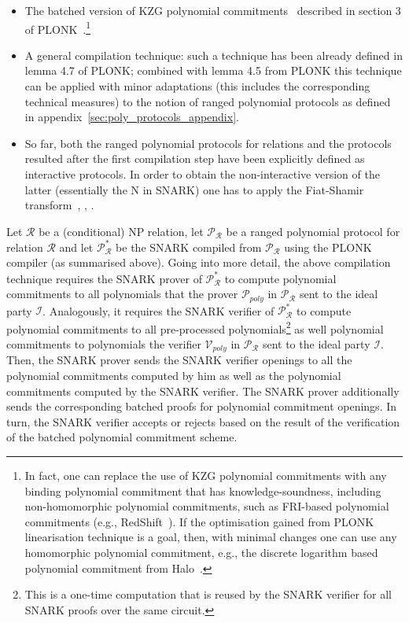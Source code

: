 \begin{itemize}
\item  The batched version of KZG polynomial commitments~\cite{KZG_10} described in section 3 of PLONK~\cite{plonk}.\footnote{In fact, 
one can replace the use of KZG polynomial commitments with any binding polynomial commitment that has knowledge-soundness, including non-homomorphic polynomial commitments, 
such as FRI-based polynomial commitments (e.g., RedShift~\cite{redshift}). If the optimisation gained from PLONK linearisation technique is a goal, 
then, with minimal changes one can use any homomorphic polynomial commitment, e.g., the discrete logarithm based polynomial commitment 
from Halo~\cite{halo}.}
\item A general compilation technique: such a technique has been already defined in lemma 4.7 of PLONK; combined with lemma 4.5 
from PLONK this technique can be applied with minor adaptations (this includes the corresponding technical measures) to the notion of ranged 
polynomial protocols as defined in appendix~\ref{sec:poly_protocols_appendix}.  
\item So far, both the ranged polynomial protocols for relations and the protocols resulted after the first compilation step have been explicitly defined as interactive 
protocols. In order to obtain the non-interactive version of the latter (essentially the N in SNARK) one has to apply the Fiat-Shamir 
transform~\cite{FS_transform}, \cite{FS_transform_with_proof}, \cite{SE_plonk}.
\end{itemize}

\noindent Let $\mathcal{R}$ be a (conditional) NP relation, let $\mathscr{P}_{\mathcal{R}}$ be a ranged polynomial protocol for 
relation $\mathcal{R}$ and let $\mathscr{P}^*_{\mathcal{R}}$ be the SNARK compiled from $\mathscr{P}_{\mathcal{R}}$ using the PLONK compiler 
(as summarised above). Going into more detail, the above compilation technique requires the SNARK prover of  $\mathscr{P}^*_{\mathcal{R}}$ to compute 
polynomial commitments to all polynomials that the prover $\mathcal{P}_{poly}$ in $\mathscr{P}_{\mathcal{R}}$ sent to the ideal party $\mathcal{I}$. Analogously, 
it requires the SNARK verifier of $\mathscr{P}^*_{\mathcal{R}}$ to compute polynomial commitments to all pre-processed polynomials\footnote{This is a one-time computation that is 
reused by the SNARK verifier for all SNARK proofs over the same circuit.} as well polynomial commitments to polynomials the verifier $\mathcal{V}_{poly}$ 
in $\mathscr{P}_{\mathcal{R}}$ sent to the ideal party $\mathcal{I}$. Then, the SNARK prover sends the SNARK verifier openings to 
all the polynomial commitments computed by him as well as the polynomial commitments computed by the SNARK verifier. The SNARK 
prover additionally sends the corresponding batched proofs for polynomial commitment openings. In turn, the SNARK verifier accepts or rejects based 
on the result of the verification of the batched polynomial commitment scheme. \\


